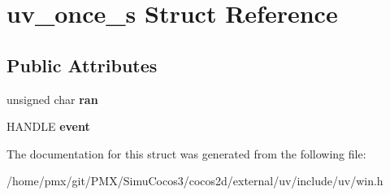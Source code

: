 \hypertarget{structuv__once__s}{}\section{uv\+\_\+once\+\_\+s Struct Reference}
\label{structuv__once__s}
\subsection*{Public Attributes}
\begin{DoxyCompactItemize}
\item 
\mbox{\label{structuv__once__s_a95803dd202dab4cb7b1578d09f79f2f8}} 
unsigned char {\bfseries ran}
\item 
\mbox{\label{structuv__once__s_a2bf4247a8c9fe869796f2fb6afd76eb4}} 
H\+A\+N\+D\+LE {\bfseries event}
\end{DoxyCompactItemize}


The documentation for this struct was generated from the following file\+:\begin{DoxyCompactItemize}
\item 
/home/pmx/git/\+P\+M\+X/\+Simu\+Cocos3/cocos2d/external/uv/include/uv/win.\+h\end{DoxyCompactItemize}
